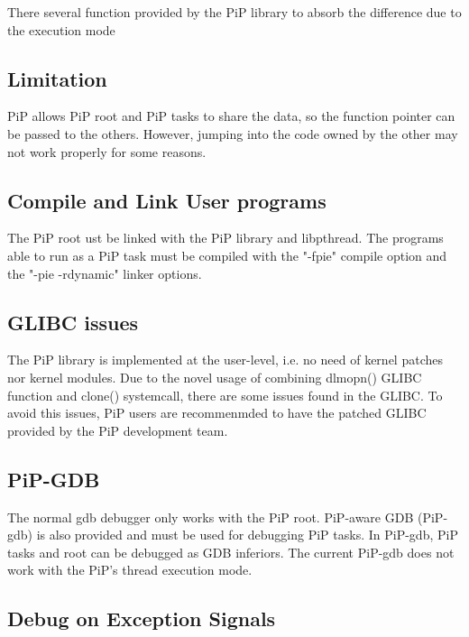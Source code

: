 There several function provided by the Pi\-P library to absorb the difference due to the execution mode\hypertarget{group__pip-overview_limitation}{}\subsection{Limitation}\label{group__pip-overview_limitation}
Pi\-P allows Pi\-P root and Pi\-P tasks to share the data, so the function pointer can be passed to the others. However, jumping into the code owned by the other may not work properly for some reasons.\hypertarget{group__pip-overview_compile-and-link}{}\subsection{Compile and Link User programs}\label{group__pip-overview_compile-and-link}
The Pi\-P root ust be linked with the Pi\-P library and libpthread. The programs able to run as a Pi\-P task must be compiled with the "-\/fpie" compile option and the "-\/pie -\/rdynamic" linker options.\hypertarget{group__pip-overview_glibc-issues}{}\subsection{G\-L\-I\-B\-C issues}\label{group__pip-overview_glibc-issues}
The Pi\-P library is implemented at the user-\/level, i.\-e. no need of kernel patches nor kernel modules. Due to the novel usage of combining {\ttfamily dlmopn()} G\-L\-I\-B\-C function and {\ttfamily clone()} systemcall, there are some issues found in the G\-L\-I\-B\-C. To avoid this issues, Pi\-P users are recommenmded to have the patched G\-L\-I\-B\-C provided by the Pi\-P development team.\hypertarget{group__pip-overview_PiP-GDB}{}\subsection{Pi\-P-\/\-G\-D\-B}\label{group__pip-overview_PiP-GDB}
The normal gdb debugger only works with the Pi\-P root. Pi\-P-\/aware G\-D\-B (Pi\-P-\/gdb) is also provided and must be used for debugging Pi\-P tasks. In Pi\-P-\/gdb, Pi\-P tasks and root can be debugged as G\-D\-B inferiors. The current Pi\-P-\/gdb does not work with the Pi\-P's thread execution mode.\hypertarget{group__pip-overview_debug}{}\subsection{Debug on Exception Signals}\label{group__pip-overview_debug}
